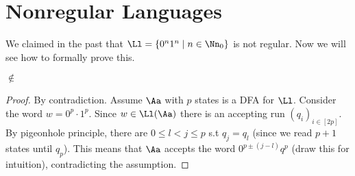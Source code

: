 \section{Nonregular Languages}
We claimed in the past that $\Ll = \{0^n1^n\mid n\in \Nn_{0} \}$ is not regular. Now we will see how to formally prove this. 
\begin{claim}
	\Ll$\notin$\Reg
\end{claim}
\begin{proof}
	By contradiction. Assume $\Aa$ with $p$ states is a DFA for $\Ll$. Consider the word $w = 0^p \cdot 1^p$. Since $w\in \Ll(\Aa)$ there is an accepting run $(q_i)_{i\in [2p]}$. By pigeonhole principle, there are $0 \leq l < j \leq p$ s.t $q_j = q_l$ (since we read $p+1$ states until $q_p$). This means that $\Aa$ accepts the word $0^{p\pm(j-l)}q^p$ (draw this for intuition), contradicting the assumption.
\end{proof}
